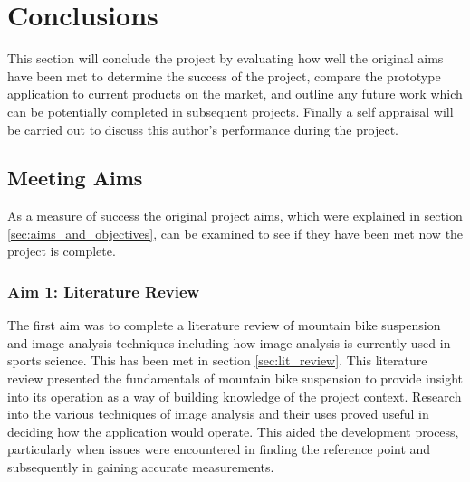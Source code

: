 \section{Conclusions}\label{sec:conclusion}
	This section will conclude the project by evaluating how well the original aims have been met to determine the success of the project, compare the prototype application to current products on the market, and outline any future work which can be potentially completed in subsequent projects. Finally a self appraisal will be carried out to discuss this author's performance during the project.
	\subsection{Meeting Aims}
		As a measure of success the original project aims, which were explained in section \ref{sec:aims_and_objectives}, can be examined to see if they have been met now the project is complete. 
		\subsubsection{Aim 1: Literature Review}
			The first aim was to complete a literature review of mountain bike suspension and image analysis techniques including how image analysis is currently used in sports science. This has been met in section \ref{sec:lit_review}. This literature review presented the fundamentals of mountain bike suspension to provide insight into its operation as a way of building knowledge of the project context. Research into the various techniques of image analysis and their uses proved useful in deciding how the application would operate. This aided the development process, particularly when issues were encountered in finding the reference point and subsequently in gaining accurate measurements.
